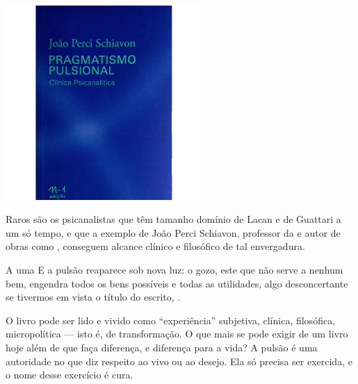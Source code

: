 \begin{center}
\hspace*{-3.6cm}
\hspace*{3.1cm}\includegraphics[width=74mm]{./grid/gozo.jpg}
\end{center}

\hspace*{-7cm}\hrulefill\hspace*{-7cm}

\medskip

\noindent{}Raros são os psicanalistas que têm tamanho domínio de Lacan e de Guattari a um só tempo, e que a exemplo de João Perci Schiavon, professor da  e autor de obras como {}, conseguem alcance clínico e filosófico de tal envergadura.  

A uma  E a pulsão reaparece sob nova luz: o gozo, este que não serve a nenhum bem, engendra todos os bens possíveis e todas as utilidades, algo desconcertante se tivermos em vista o título do escrito, {}.

O livro pode ser lido e vivido como “experiência” subjetiva, clínica, filosófica, micropolítica --- isto é, de transformação. O que mais se pode exigir de um livro hoje além de que faça diferença, e diferença para a vida? A pulsão é uma autoridade no que diz respeito ao vivo ou ao desejo. Ela só precisa ser exercida, e o nome desse exercício é cura.

\vfill

